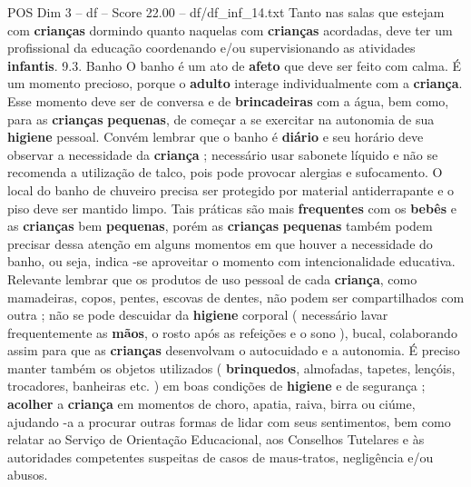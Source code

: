 \begin{textsample}{POS Dim 3 – df – Score 22.00 – df/df\_inf\_14.txt}
Tanto nas salas que estejam com \textbf{crianças} dormindo quanto naquelas com \textbf{crianças} acordadas, deve ter um profissional da educação coordenando e/ou supervisionando as atividades \textbf{infantis}. 9.3.
Banho O banho é um ato de \textbf{afeto} que deve ser feito com calma.
É um momento precioso, porque o \textbf{adulto} interage individualmente com a \textbf{criança}.
Esse momento deve ser de conversa e de \textbf{brincadeiras} com a água, bem como, para as \textbf{crianças} \textbf{pequenas}, de começar a se exercitar na autonomia de sua \textbf{higiene} pessoal.
Convém lembrar que o banho é \textbf{diário} e seu horário deve observar a necessidade da \textbf{criança} ; necessário usar sabonete líquido e não se recomenda a utilização de talco, pois pode provocar alergias e sufocamento.
O local do banho de chuveiro precisa ser protegido por material antiderrapante e o piso deve ser mantido limpo.
Tais práticas são mais \textbf{frequentes} com os \textbf{bebês} e as \textbf{crianças} bem \textbf{pequenas}, porém as \textbf{crianças} \textbf{pequenas} também podem precisar dessa atenção em alguns momentos em que houver a necessidade do banho, ou seja, indica -se aproveitar o momento com intencionalidade educativa.
Relevante lembrar que os produtos de uso pessoal de cada \textbf{criança}, como mamadeiras, copos, pentes, escovas de dentes, não podem ser compartilhados com outra ; não se pode descuidar da \textbf{higiene} corporal ( necessário lavar frequentemente as \textbf{mãos}, o rosto após as refeições e o sono ), bucal, colaborando assim para que as \textbf{crianças} desenvolvam o autocuidado e a autonomia.
É preciso manter também os objetos utilizados ( \textbf{brinquedos}, almofadas, tapetes, lençóis, trocadores, banheiras etc. ) em boas condições de \textbf{higiene} e de segurança ; \textbf{acolher} a \textbf{criança} em momentos de choro, apatia, raiva, birra ou ciúme, ajudando -a a procurar outras formas de lidar com seus sentimentos, bem como relatar ao Serviço de Orientação Educacional, aos Conselhos Tutelares e às autoridades competentes suspeitas de casos de maus-tratos, negligência e/ou abusos.

\end{textsample}
